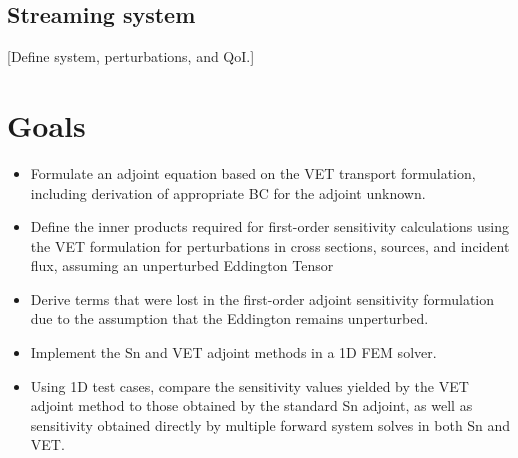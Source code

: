 \documentclass{article}
\begin{document}
\subsection{Streaming system}

[Define system,  perturbations, and QoI.]

\section{Goals}

\begin{itemize}
\item Formulate an adjoint equation based on the VET transport formulation, including derivation of appropriate BC for the adjoint unknown.
\item Define the inner products required for first-order sensitivity calculations using the VET formulation for perturbations in cross sections, sources, and incident flux, assuming an unperturbed Eddington Tensor
\item Derive terms that were lost in the first-order adjoint sensitivity formulation due to the assumption that the Eddington remains unperturbed. 
\item Implement the Sn and VET adjoint methods in a 1D FEM solver. 
\item Using 1D test cases, compare the sensitivity values yielded by the VET adjoint method to those obtained by the standard Sn adjoint, as well as sensitivity obtained directly by multiple forward system solves in both Sn and VET.
\end{itemize}

\newpage

\end{document}
